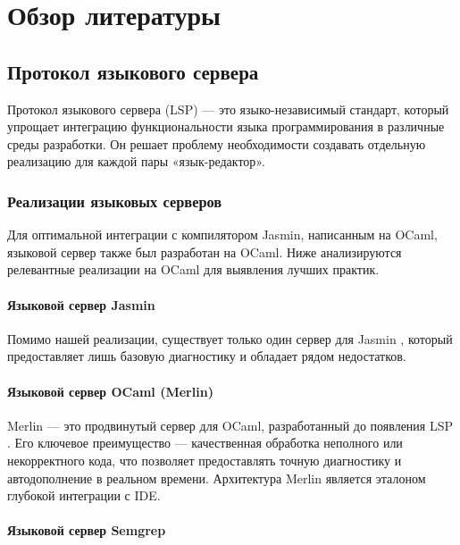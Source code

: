 \chapter{Обзор литературы}

\label{chap:background}

\section{Протокол языкового сервера}

Протокол языкового сервера (LSP) \cite{language-server-protocol:2016} — это
языко-независимый стандарт, который упрощает интеграцию функциональности языка
программирования в различные среды разработки. Он решает проблему необходимости
создавать отдельную реализацию для каждой пары «язык-редактор».

\subsection*{Реализации языковых серверов}

\label{sec:background:implementations}

Для оптимальной интеграции с компилятором Jasmin, написанным на OCaml, языковой
сервер также был разработан на OCaml. Ниже анализируются релевантные реализации
на OCaml для выявления лучших практик.

\subsubsection*{Языковой сервер Jasmin}

Помимо нашей реализации, существует только один сервер для Jasmin
\cite{gh-jasmin-lsp}, который предоставляет лишь базовую диагностику и обладает
рядом недостатков.

\subsubsection*{Языковой сервер OCaml (Merlin)}

Merlin \cite{gh-merlin} — это продвинутый сервер для OCaml, разработанный до
появления LSP \cite{merlin:2018}. Его ключевое преимущество — качественная
обработка неполного или некорректного кода, что позволяет предоставлять точную
диагностику и автодополнение в реальном времени. Архитектура Merlin является
эталоном глубокой интеграции с IDE.

\subsubsection*{Языковой сервер Semgrep}

